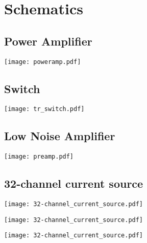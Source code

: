\chapter{Schematics}
\section{Power Amplifier}
\texttt{[image: poweramp.pdf]}

\section{Switch}
\texttt{[image: tr\_switch.pdf]}

\section{Low Noise Amplifier}
\texttt{[image: preamp.pdf]}

\section{32-channel current source}
\texttt{[image: 32-channel\_current\_source.pdf]}

\texttt{[image: 32-channel\_current\_source.pdf]}

\texttt{[image: 32-channel\_current\_source.pdf]}




